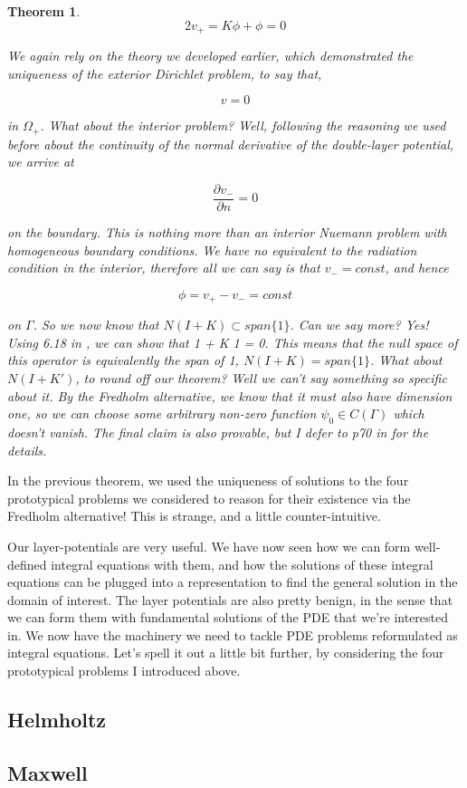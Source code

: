 \documentclass[12pt, a4, twoside]{article}
\newtheorem{theorem}{Theorem}[section]
\begin{document}
\begin{theorem}
    $$ 2v_+ = K\phi + \phi = 0 $$

    We again rely on the theory we developed earlier, which demonstrated the uniqueness of the exterior Dirichlet problem, to say that,

    $$ v = 0$$

    in $\Omega_+$. What about the interior problem? Well, following the reasoning we used before about the continuity of the normal derivative of the double-layer potential, we arrive at

    $$ \frac{\partial v_-}{ \partial n} = 0 $$

    on the boundary. This is nothing more than an interior Nuemann problem with homogeneous boundary conditions. We have no equivalent to the radiation condition in the interior, therefore all we can say is that $v_- = const$, and hence

    $$ \phi = v_+-v_- = const$$

    on $\Gamma$. So we now know that $N(I+K) \subset span \{ 1 \}$. Can we say more? Yes! Using 6.18 in \cite*[]{kress2012}, we can show that 1 + K 1 = 0. This means that the null space of this operator is equivalently the span of 1, $N(I+K) = span \{ 1 \}$. What about $N(I+K')$, to round off our theorem? Well we can't say something so specific about it. By the Fredholm alternative, we know that it must also have dimension one, so we can choose some arbitrary non-zero function $\psi_0 \in C(\Gamma)$ which doesn't vanish. The final claim is also provable, but I defer to p70 in \cite*[]{kress2012} for the details.
\end{theorem}

In the previous theorem, we used the uniqueness of solutions to the four prototypical problems we considered to reason for their existence via the Fredholm alternative! This is strange, and a little counter-intuitive.


Our layer-potentials are very useful. We have now seen how we can form well-defined integral equations with them, and how the solutions of these integral equations can be plugged into a representation to find the general solution in the domain of interest. The layer potentials are also pretty benign, in the sense that we can form them with fundamental solutions of the PDE that we're interested in. We now have the machinery we need to tackle PDE problems reformulated as integral equations. Let's spell it out a little bit further, by considering the four prototypical problems I introduced above.



\subsection{Helmholtz}

\subsection{Maxwell}


\printbibliography[heading=bibintoc]
\end{document}
